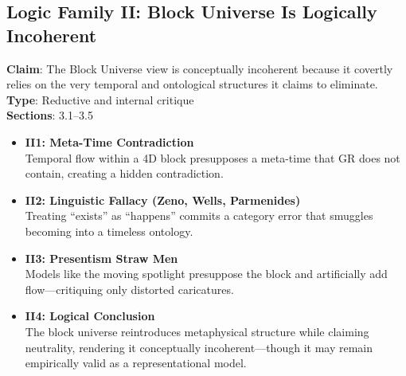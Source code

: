 \documentclass[12pt]{book}
\begin{document}
\vspace{1em}

\subsection*{Logic Family II: Block Universe Is Logically Incoherent}
\textbf{Claim}: The Block Universe view is conceptually incoherent because it covertly relies on the very temporal and ontological structures it claims to eliminate.\\
\textbf{Type}: Reductive and internal critique\\
\textbf{Sections}: 3.1–3.5
\begin{itemize}
  \item \textbf{II1: Meta-Time Contradiction} \\
  Temporal flow within a 4D block presupposes a meta-time that GR does not contain, creating a hidden contradiction.
  \item \textbf{II2: Linguistic Fallacy (Zeno, Wells, Parmenides)} \\
  Treating ``exists'' as ``happens'' commits a category error that smuggles becoming into a timeless ontology.
  \item \textbf{II3: Presentism Straw Men} \\
  Models like the moving spotlight presuppose the block and artificially add flow---critiquing only distorted caricatures.
  \item \textbf{II4: Logical Conclusion} \\
  The block universe reintroduces metaphysical structure while claiming neutrality, rendering it conceptually incoherent---though it may remain empirically valid as a representational model.
\end{itemize}
\end{document}
